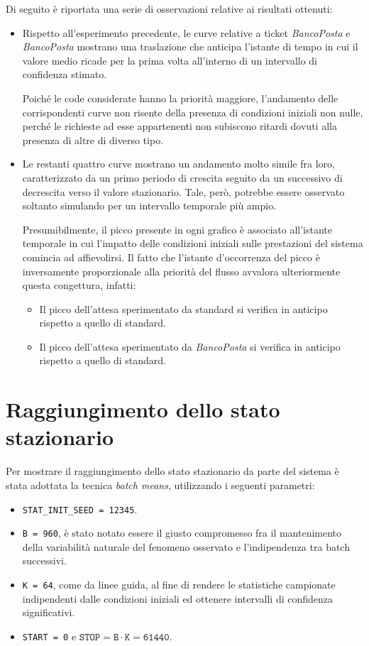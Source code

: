 Di seguito è riportata una serie di osservazioni relative ai risultati ottenuti:
\begin{itemize}
\item Rispetto all'esperimento precedente, le curve relative a ticket \uo{} \textsl{BancoPosta} e \pp{} \textsl{BancoPosta} mostrano una traslazione che anticipa l'istante di tempo in cui il valore medio ricade per la prima volta all'interno di un intervallo di confidenza stimato.

Poiché le code considerate hanno la priorità maggiore, l'andamento delle corrispondenti curve non risente della presenza di condizioni iniziali non nulle, perché le richieste ad esse appartenenti non subiscono ritardi dovuti alla presenza di altre di diverso tipo.
\item Le restanti quattro curve mostrano un andamento molto simile fra loro, caratterizzato da un primo periodo di crescita seguito da un successivo di decrescita verso il valore stazionario. Tale, però, potrebbe essere osservato soltanto simulando per un intervallo temporale più ampio.

Presumibilmente, il picco presente in ogni grafico è associato all'istante temporale in cui l'impatto delle condizioni iniziali sulle prestazioni del sistema comincia ad affievolirsi. Il fatto che l'istante d'occorrenza del picco è inversamente proporzionale alla priorità del flusso avvalora ulteriormente questa congettura, infatti:
\begin{itemize}
\item Il picco dell'attesa sperimentato da \uo{} standard si verifica in anticipo rispetto a quello di \pp{} standard.
\item Il picco dell'attesa sperimentato da \sr{} \textsl{BancoPosta} si verifica in anticipo rispetto a quello di \sr{} standard.
\end{itemize}
\end{itemize}

\section{Raggiungimento dello stato stazionario}\label{sec:esperimenti-simulazione-stazionario}
Per mostrare il raggiungimento dello stato stazionario da parte del sistema è stata adottata la tecnica \textit{batch means}, utilizzando i seguenti parametri:
\begin{itemize}
\item \texttt{STAT\_INIT\_SEED = 12345}.
\item \texttt{B = 960}, è stato notato essere il giusto compromesso fra il mantenimento della variabilità naturale del fenomeno osservato e l'indipendenza tra batch successivi.
\item \texttt{K = 64}, come da linee guida, al fine di rendere le statistiche campionate indipendenti dalle condizioni iniziali ed ottenere intervalli di confidenza significativi.
\item \texttt{START = 0} e $\mathtt{STOP = B \cdot K = 61440}$.
\end{itemize}

